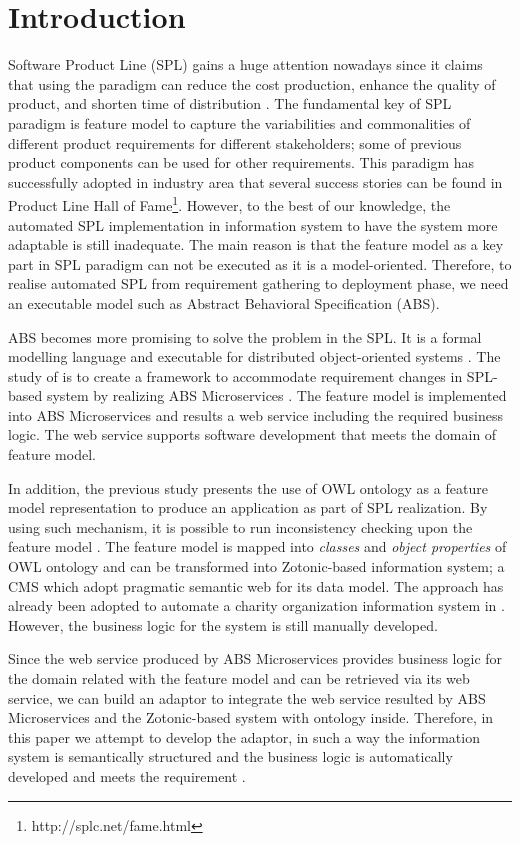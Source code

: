 \documentclass[conference]{IEEEtran}
\begin{document}
\section{Introduction} \label{introduction}
Software Product Line (SPL) gains a huge attention nowadays since it claims that using the paradigm can reduce the cost production, enhance the quality of product, and shorten time of distribution \cite{pohl:SPLE}. The fundamental key of SPL paradigm is feature model to capture the variabilities and commonalities of different product requirements for different stakeholders; some of previous product components can be used for other requirements. This paradigm has successfully adopted in industry area that several success stories can be found in Product Line Hall of Fame\footnote{http://splc.net/fame.html}. However, to the best of our knowledge, the automated SPL implementation in information system to have the system more adaptable is still inadequate. The main reason is that the feature model as a key part in SPL paradigm can not be executed as it is a model-oriented. Therefore, to realise automated SPL from requirement gathering to deployment phase, we need an executable model such as Abstract Behavioral Specification (ABS).

ABS becomes more promising to solve the problem in the SPL. It is a formal modelling language and executable for distributed object-oriented systems \cite{ABS}\cite{ABSTutorial}. The study of \cite{absmc} is to create a framework to accommodate requirement changes in SPL-based system by realizing ABS Microservices \cite{absmc}. The feature model is implemented into ABS Microservices and results a web service including the required business logic. The web service supports software development that meets the domain of feature model.

In addition, the previous study \cite{fmontology} presents the use of OWL ontology as a feature model representation to produce an application as part of SPL realization. By using such mechanism, it is possible to run inconsistency checking upon the feature model \cite{verify}. The feature model is mapped into \textit{classes} and \textit{object properties} of OWL ontology and can be transformed into Zotonic-based information system; a CMS which adopt pragmatic semantic web for its data model. The approach has already been adopted to automate a charity organization information system in \cite{bravyto}. However, the business logic for the system is still manually developed.

Since the web service produced by ABS Microservices provides business logic for the domain related with the feature model and can be retrieved via its web service, we can build an adaptor to integrate the web service resulted by ABS Microservices and the Zotonic-based system with ontology inside. Therefore, in this paper we attempt to develop the adaptor, in such a way the information system is semantically structured and the business logic is automatically developed and meets the requirement .
\end{document}
